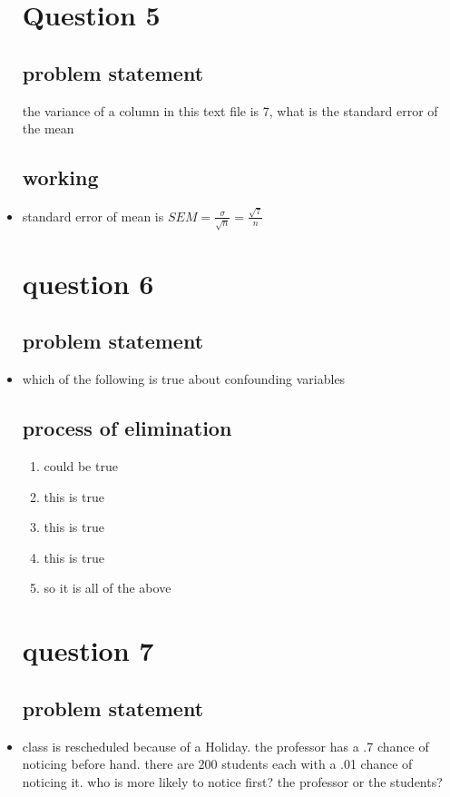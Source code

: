 \documentclass{article}
\begin{document}
\begin{itemize}
\section{Question 5}
\subsection{problem statement}
the variance of a column in this text file is 7, what is the standard error of the mean 
\subsection{working}
\item standard error of mean is $SEM=\frac{\sigma}{\sqrt{n}}=\frac{\sqrt{7}}{n}$


\section{question 6 }
\subsection{problem statement}
\item which of the following is true about confounding variables
\subsection{process of elimination}
\begin{enumerate}
    \item could be true 
    \item this is true 
    \item this is true 
    \item this is true 
    \item so it is all of the above
\end{enumerate}


\section{question 7}
\subsection{problem statement}
\item class is rescheduled because of a Holiday. the professor has a .7 chance of noticing before hand. there are 200 students each with a .01 chance of noticing it. who is more likely to notice first? the professor or the students? 

\end{itemize}
\end{document}
